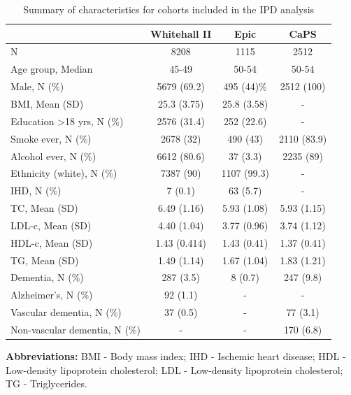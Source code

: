 \documentclass[a4paper, twoside]{templates/ociamthesis}
\begin{document}
\begin{table}[H]

\caption[Summary of characteristics of IPD cohorts]{\label{tab:covariateSummary-table}Summary of characteristics for cohorts included in the IPD analysis}
\centering
\begin{threeparttable}
\begin{tabular}[t]{>{}lccc}
\toprule
\textbf{ } & \textbf{Whitehall II} & \textbf{Epic} & \textbf{CaPS}\\
\midrule
N & 8208 & 1115 & 2512\\
\midrule
Age group, Median & 45-49 & 50-54 & 50-54\\
\midrule
Male, N (\%) & 5679 (69.2) & 495 (44)\% & 2512 (100)\\
\midrule
BMI, Mean (SD) & 25.3 (3.75) & 25.8 (3.58) & -\\
\midrule
Education >18 yrs, N (\%) & 2576 (31.4) & 252 (22.6) & -\\
\midrule
\addlinespace
Smoke ever, N (\%) & 2678 (32) & 490 (43) & 2110 (83.9)\\
\midrule
Alcohol ever, N (\%) & 6612 (80.6) & 37 (3.3) & 2235 (89)\\
\midrule
Ethnicity (white), N (\%) & 7387 (90) & 1107 (99.3) & -\\
\midrule
IHD, N (\%) & 7 (0.1) & 63 (5.7) & -\\
\midrule
TC, Mean (SD) & 6.49 (1.16) & 5.93 (1.08) & 5.93 (1.15)\\
\midrule
\addlinespace
LDL-c, Mean (SD) & 4.40 (1.04) & 3.77 (0.96) & 3.74 (1.12)\\
\midrule
HDL-c, Mean (SD) & 1.43 (0.414) & 1.43 (0.41) & 1.37 (0.41)\\
\midrule
TG, Mean (SD) & 1.49 (1.14) & 1.67 (1.04) & 1.83 (1.21)\\
\midrule
Dementia, N (\%) & 287 (3.5) & 8 (0.7) & 247 (9.8)\\
\midrule
Alzheimer's, N (\%) & 92 (1.1) & - & -\\
\midrule
\addlinespace
Vascular dementia, N (\%) & 37 (0.5) & - & 77 (3.1)\\
\midrule
Non-vascular dementia, N (\%) & - & - & 170 (6.8)\\
\bottomrule
\end{tabular}
\begin{tablenotes}
\item \textbf{Abbreviations:} BMI - Body mass index; IHD - Ischemic heart disease; HDL - Low-density lipoprotein cholesterol; LDL - Low-density lipoprotein cholesterol; TG - Triglycerides.
\end{tablenotes}
\end{threeparttable}
\end{table}
\end{document}
